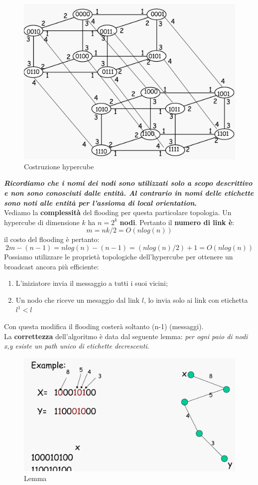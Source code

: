\documentclass[12pt]{article}
\begin{document}
			\begin{figure}[h!]
				\centering
				\includegraphics[scale=0.20]{img/hyper2.png}
				\caption{Costruzione hypercube}
			\end{figure}
			\textbf{\textit{Ricordiamo che i nomi dei nodi sono utilizzati solo a scopo descrittivo e non sono conosciuti dalle entità. Al contrario in nomi delle etichette sono noti alle entità per l'assioma di local orientation}.}\\
			Vediamo la \textbf{complessità} del flooding per questa particolare topologia. Un hypercube di dimensione $k$ ha $n=2^{k}$ \textbf{nodi}. Pertanto il \textbf{numero di link è}:
			$$m=nk/2= O(nlog(n)) $$ il costo del flooding è pertanto:
			$$2m-(n-1) = nlog(n)-(n-1)=(nlog(n)/2) +1=O(nlog(n))$$
			Possiamo utilizzare le proprietà topologiche dell'hypercube per ottenere un broadcast ancora più efficiente:
			\begin{enumerate}
				\item L'iniziatore invia il messaggio a tutti i suoi vicini;
				\item Un nodo che riceve un mesaggio dal link $l$, lo invia solo ai link con etichetta $l^{1}<l$ 
			\end{enumerate}
			Con questa modifica il flooding costerà soltanto (n-1) (messaggi).\\
			La \textbf{correttezza} dell'algoritmo è data dal seguente lemma: \textit{per ogni paio di nodi x,y esiste un path unico di etichette decrescenti}.
			\begin{figure}[h!]
				\centering
				\includegraphics[scale=0.20]{img/hyper3.png}
				\caption{Lemma}
			\end{figure}
\end{document}

